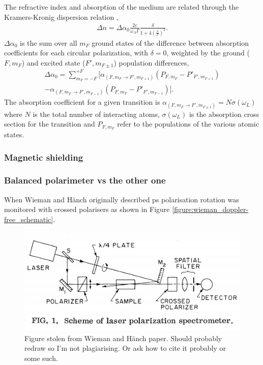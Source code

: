 The refractive index and absorption of the medium are related through the Kramers-Kronig dispersion relation \cite{demtroder_laser_2003},
\begin{align}
\Delta n = \Delta\alpha_0 \frac{2c}{\omega_A \Gamma}\frac{\delta}{1+4\left(\frac{\delta}{\Gamma}\right)^2}.\label{result}
\end{align}
$\Delta\alpha_0$ is the sum over all $m_F$ ground states of the difference between absorption coefficients for each circular polarization, with $\delta=0$, weighted by the ground ($F, m_F$) and excited state ($F', m_{F\pm1}$) population differences,
\begin{align}
\Delta\alpha_0 = \sum_{m_F=-F}^{+F} \big[\alpha_{(F,m_F\rightarrow F',m_{F+1})}(P_{F,m_F}-P'_{F',m_{F+1}})\nonumber\\
-\alpha_{(F,m_F\rightarrow F',m_{F-1})}(P_{F,m_F}-P'_{F',m_{F-1}})\big].
\end{align}
The absorption coefficient for a given transition is $\alpha_{(F, m_F\rightarrow F',m_{F\pm1})}=N \sigma(\omega_L)$ where $N$ is the total number of interacting atoms, $\sigma(\omega_L)$ is the absorption cross section for the transition and $P_{F,m_F}$ refer to the populations of the various atomic states.

\subsubsection{Magnetic shielding}
\subsubsection{Balanced polarimeter vs the other one}

When Wieman and H\"anch\cite{wieman_doppler-free_1976} originally described \gls{ps} polarisation rotation was monitored with crossed polarisers as shown in Figure \ref{figure:wieman_doppler-free_schematic}.

\begin{figure}
\includegraphics[width=\linewidth]{chapter1/Figs/wieman_doppler-free_schematic.png}
\caption{Figure stolen from Wieman and H\"anch paper. Should probably redraw so I'm not plagiarising. Or ask how to cite it probably or some such.}
\end{figure}

